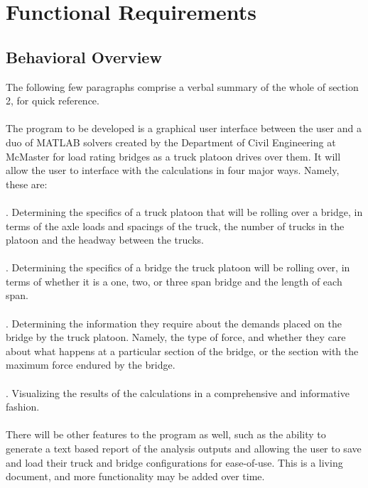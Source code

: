 \documentclass[12pt]{article}
\begin{document}
\section{Functional Requirements}
\subsection{Behavioral Overview}
The following few paragraphs comprise a verbal summary of the whole of section 2, for quick reference.\\\\

\noindent The program to be developed is a graphical user interface between the user and a duo of MATLAB solvers created by the Department of Civil Engineering at McMaster
for load rating bridges as a truck platoon drives over them. It will allow the user to interface with the calculations in four major ways. Namely, these are:\\\\ 

. Determining the specifics of a truck platoon that will be rolling over a bridge, in terms of the axle loads and spacings of the truck, the number of trucks in
the platoon and the headway between the trucks.\\\\

. Determining the specifics of a bridge the truck platoon will be rolling over, in terms of whether it 
is a one, two, or three span bridge and the length of each span.\\\\

. Determining the information they require about the demands placed on the bridge by the truck platoon. Namely, the type of force, and whether they care about what happens at a particular section of the bridge, or the section with the maximum force endured by the bridge.\\\\

. Visualizing the results of the calculations in a comprehensive and informative fashion.\\\\

\noindent There will be other features to the program as well, such as the ability to generate a text based report of 
the analysis outputs and allowing the user
to save and load their truck and bridge configurations for ease-of-use. This is a living document, and more functionality may be added over time.
\end{document}
